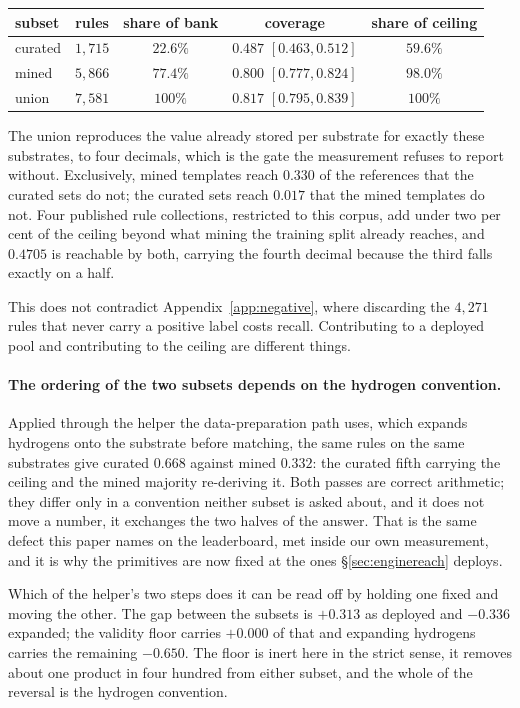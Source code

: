 \begin{center}
\begin{tabular}{lcccc}
\toprule
subset & rules & share of bank & coverage & share of ceiling \\
\midrule
curated & $1{,}715$ & $22.6\%$ & $0.487$ $[0.463,0.512]$ & $59.6\%$ \\
mined   & $5{,}866$ & $77.4\%$ & $0.800$ $[0.777,0.824]$ & $98.0\%$ \\
union   & $7{,}581$ & $100\%$  & $0.817$ $[0.795,0.839]$ & $100\%$ \\
\bottomrule
\end{tabular}
\end{center}

The union reproduces the value already stored per substrate for exactly these substrates, to four
decimals, which is the gate the measurement refuses to report without. Exclusively, mined templates
reach $0.330$ of the references that the curated sets do not; the curated sets reach $0.017$ that
the mined templates do not. Four published rule collections, restricted to this corpus, add under
two per cent of the ceiling beyond what mining the training split already reaches, and $0.4705$ is
reachable by both, carrying the fourth decimal because the third falls exactly on a half.

This does not contradict Appendix~\ref{app:negative}, where discarding the $4{,}271$ rules that
never carry a positive label costs recall. Contributing to a deployed pool and contributing to the
ceiling are different things.

\paragraph{The ordering of the two subsets depends on the hydrogen convention.} Applied through the helper the data-preparation path uses, which expands hydrogens
onto the substrate before matching, the same rules on the same substrates give curated $0.668$
against mined $0.332$: the curated fifth carrying the ceiling and the mined majority
re-deriving it. Both passes are correct arithmetic; they differ only in a convention neither
subset is asked about, and it does not move a number, it exchanges the two halves of the answer.
That is the same defect this paper names on the leaderboard, met inside our own measurement, and it
is why the primitives are now fixed at the ones \S\ref{sec:enginereach} deploys.

Which of the helper's two steps does it can be read off by holding one fixed and moving the other.
The gap between the subsets is $+0.313$ as deployed and $-0.336$ expanded; the validity floor
carries $+0.000$ of that and expanding hydrogens carries the remaining $-0.650$. The floor is
inert here in the strict sense, it removes about one product in four hundred from either
subset, and the whole of the reversal is the hydrogen convention.

